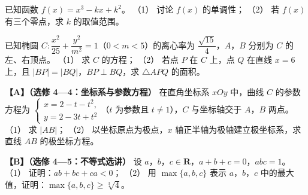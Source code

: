 \begin{question}
已知函数 $f(x)=x^3-kx+k^2$。
（1） 讨论 $f(x)$ 的单调性；
（2） 若 $f(x)$ 有三个零点，求 $k$ 的取值范围。
\end{question}
\begin{question}
已知椭圆 $C:\dfrac{x^2}{25}+\dfrac{y^2}{m^2}=1$（$0<m<5$）的离心率为 $\dfrac{\sqrt{15}}4$，$A$，$B$ 分别为 $C$ 的左、右顶点。
（1） 求 $C$ 的方程；
（2） 若点 $P$ 在 $C$ 上，点 $Q$ 在直线 $x=6$ 上，且 $|BP|=|BQ|$，$BP\perp BQ$，求 $\triangle APQ$ 的面积。
\end{question}
\begin{question}
\textbf{【A】（选修 4—4：坐标系与参数方程）} 在直角坐标系 $xOy$ 中，曲线 $C$ 的参数方程为 $\begin{cases}x=2-t-t^2,\\y=2-3t+t^2\end{cases}$（$t$ 为参数且 $t\neq1$），$C$ 与坐标轴交于 $A$，$B$ 两点。
（1） 求 $|AB|$；
（2） 以坐标原点为极点，$x$ 轴正半轴为极轴建立极坐标系，求直线 $AB$ 的极坐标方程。
\end{question}
\begin{question}
\textbf{【B】（选修 4—5：不等式选讲）} 设 $a$，$b$，$c\in\mathbf R$，$a+b+c=0$，$abc=1$。
（1） 证明：$ab+bc+ca<0$；
（2） 用 $\max\{a,b,c\}$ 表示 $a$，$b$，$c$ 中的最大值，证明：$\max\{a,b,c\}\geqslant\sqrt[3]{4}$。

\end{question}